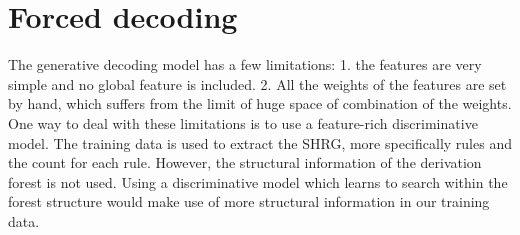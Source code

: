 %

\section{Forced decoding}
The generative decoding model has a few limitations: 1. the features are very simple and no global feature is included. 2. All the weights of the features are
set by hand, which suffers from the limit of huge space of combination of the weights.
One way to deal with these limitations is to use a feature-rich discriminative model. The training data is used to extract the SHRG, more specifically
rules and the count for each rule. However, the structural information of the derivation forest is not used. Using a discriminative model which
learns to search within the forest structure would make use of more structural information in our training data.


